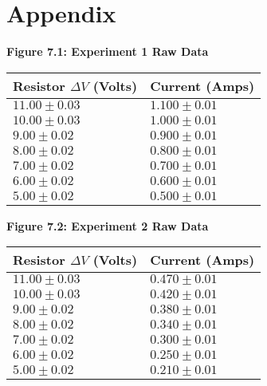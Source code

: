 \documentclass[
	letterpaper, %
	12pt, %
]{CSUniSchoolLabReport}
\begin{document}
\section{Appendix}
\begin{center}
    \textbf{Figure 7.1: Experiment 1 Raw Data}
\end{center}
\setlength\arrayrulewidth{2pt}
\begin{center}
\begin{tabular}{  | l | l | }
	\hline
	Resistor $\Delta V$ (Volts) & Current (Amps) \\
	\hline
	$11.00\pm0.03$& $1.100\pm0.01$\\
	$10.00\pm0.03$& $1.000\pm0.01$\\
	$9.00\pm0.02$& $0.900\pm0.01$\\
	$8.00\pm0.02$& $0.800\pm0.01$\\
	$7.00\pm0.02$& $0.700\pm0.01$\\
	$6.00\pm0.02$& $0.600\pm0.01$\\
	$5.00\pm0.02$& $0.500\pm0.01$\\
	\hline
\end{tabular}
\end{center}

\begin{center}
	\textbf{Figure 7.2: Experiment 2 Raw Data}
\end{center}
\begin{center}
	\begin{tabular}{  | l | l | }
		\hline
		Resistor $\Delta V$ (Volts) & Current (Amps) \\
		\hline
		$11.00\pm0.03$& $0.470\pm0.01$\\
		$10.00\pm0.03$& $0.420\pm0.01$\\
		$9.00\pm0.02$& $0.380\pm0.01$\\
		$8.00\pm0.02$& $0.340\pm0.01$\\
		$7.00\pm0.02$& $0.300\pm0.01$\\
		$6.00\pm0.02$& $0.250\pm0.01$\\
		$5.00\pm0.02$& $0.210\pm0.01$\\
		\hline
	\end{tabular}
\end{center}
\end{document}
